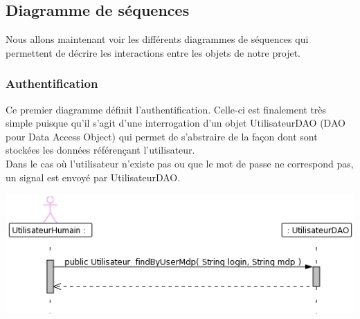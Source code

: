 \documentclass[12pt , a4paper]{article}
\begin{document}
\subsection{Diagramme de séquences}
\noindent Nous allons maintenant voir les différents diagrammes de séquences qui permettent de décrire les interactions entre les objets de notre projet.
\subsubsection{Authentification}
\noindent Ce premier diagramme définit l'authentification. Celle-ci est finalement très simple puisque qu'il s'agit d'une interrogation d'un objet UtilisateurDAO (DAO pour Data Access Object) qui
permet de s'abstraire de la façon dont sont stockées les données référençant l'utilisateur.\\
Dans le cas où l'utilisateur n'existe pas ou que le mot de passe ne correspond pas, un signal est envoyé par UtilisateurDAO.
\begin{center}
  \includegraphics[scale=0.55]{./images/diag_seq_authentification.jpg}
\end{center}
\end{document}
